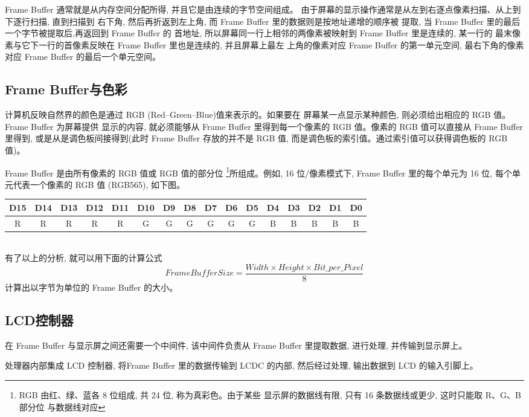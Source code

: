 Frame Buffer 通常就是从内存空间分配所得, 并且它是由连续的字节空间组成。
由于屏幕的显示操作通常是从左到右逐点像素扫描、从上到下逐行扫描, 直到扫描到
右下角, 然后再折返到左上角, 而 Frame Buffer 里的数据则是按地址递增的顺序被
提取, 当 Frame Buffer 里的最后一个字节被提取后,再返回到 Frame Buffer 的
首地址, 所以屏幕同一行上相邻的两像素被映射到 Frame Buffer 里是连续的, 某一行的
最末像素与它下一行的首像素反映在 Frame Buffer 里也是连续的, 并且屏幕上最左
上角的像素对应 Frame Buffer 的第一单元空间, 最右下角的像素对应 Frame Buffer
的最后一个单元空间。

\subsection{Frame Buffer与色彩}
计算机反映自然界的颜色是通过 RGB (Red--Green--Blue)值来表示的。如果要在
屏幕某一点显示某种颜色, 则必须给出相应的 RGB 值。Frame Buffer 为屏幕提供
显示的内容, 就必须能够从 Frame Buffer 里得到每一个像素的 RGB 值。像素的
RGB 值可以直接从 Frame Buffer 里得到, 或是从是调色板间接得到(此时 Frame
Buffer 存放的并不是 RGB 值, 而是调色板的索引值。通过索引值可以获得调色板的
RGB 值)。

Frame Buffer 是由所有像素的 RGB 值或 RGB 值的部分位
\footnote{RGB 由红、绿、蓝各 8 位组成, 共 24 位, 称为真彩色。由于某些
显示屏的数据线有限, 只有 16 条数据线或更少, 这时只能取 R、G、B 部分位
与数据线对应}所组成。例如, 16 位/像素模式下, Frame Buffer 里的每个单元为
16 位, 每个单元代表一个像素的 RGB 值 (RGB565), 如下图。\ \\
{\small
\begin{tabular}{|*{16}{c|}}
\hline
   D15 & D14 & D13 & D12 & D11 & D10 & D9 & D8 &
        D7 & D6 & D5 & D4 & D3 & D2 & D1 & D0\\\hline
  R & R & R & R & R & G & G & G & G & G & G & B & B & B & B & B\\\hline
\end{tabular}
}
\ \\

	有了以上的分析, 就可以用下面的计算公式
$$
	FrameBufferSize=\frac{Width \times Height \times Bit\_per\_Pixel}{8}
$$
计算出以字节为单位的 Frame Buffer 的大小。

\subsection{LCD控制器}
在 Frame Buffer 与显示屏之间还需要一个中间件, 该中间件负责从 Frame
Buffer 里提取数据, 进行处理, 并传输到显示屏上。

	处理器内部集成 LCD 控制器, 将Frame Buffer 里的数据传输到 LCDC 的内部,
然后经过处理, 输出数据到 LCD 的输入引脚上。

